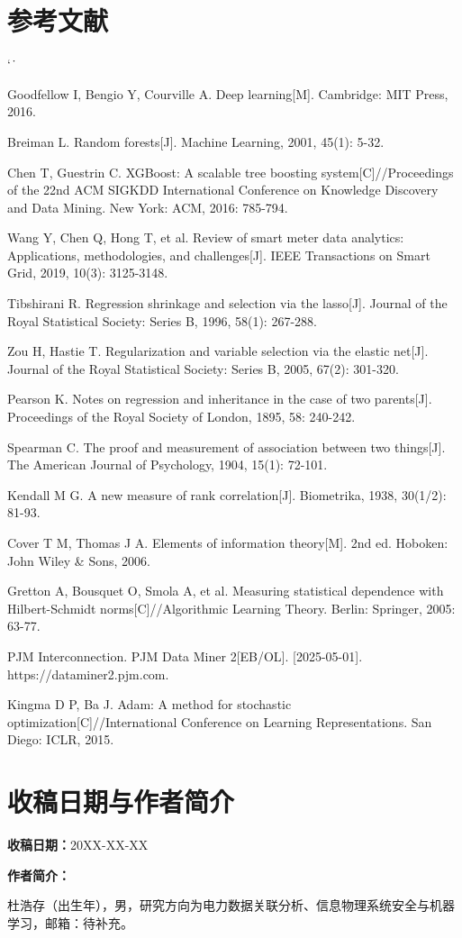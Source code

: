 \documentclass[UTF8,zihao=5,twoside]{ctexart}
\makeatletter
\numberwithin{equation}{section}
\renewcommand{\refname}{参考文献}
\renewenvironment{thebibliography}[1]{%
  \section*{\refname}%
  \small
  \list{[\arabic{enumi}]}{%
    \settowidth\labelwidth{[#1]}%
    \leftmargin\labelwidth
    \advance\leftmargin\labelsep
    \usecounter{enumi}}
  \sloppy\clubpenalty4000\widowpenalty4000\sfcode`\.\ \@m
}{\def\@noitemerr{\@latex@warning{Empty `thebibliography' environment}}\endlist}
\makeatother
\begin{document}
\begin{thebibliography}{99}
Goodfellow I, Bengio Y, Courville A. Deep learning[M]. Cambridge: MIT Press, 2016.

Breiman L. Random forests[J]. Machine Learning, 2001, 45(1): 5-32.

Chen T, Guestrin C. XGBoost: A scalable tree boosting system[C]//Proceedings of the 22nd ACM SIGKDD International Conference on Knowledge Discovery and Data Mining. New York: ACM, 2016: 785-794.

Wang Y, Chen Q, Hong T, et al. Review of smart meter data analytics: Applications, methodologies, and challenges[J]. IEEE Transactions on Smart Grid, 2019, 10(3): 3125-3148.

Tibshirani R. Regression shrinkage and selection via the lasso[J]. Journal of the Royal Statistical Society: Series B, 1996, 58(1): 267-288.

Zou H, Hastie T. Regularization and variable selection via the elastic net[J]. Journal of the Royal Statistical Society: Series B, 2005, 67(2): 301-320.

Pearson K. Notes on regression and inheritance in the case of two parents[J]. Proceedings of the Royal Society of London, 1895, 58: 240-242.

Spearman C. The proof and measurement of association between two things[J]. The American Journal of Psychology, 1904, 15(1): 72-101.

Kendall M G. A new measure of rank correlation[J]. Biometrika, 1938, 30(1/2): 81-93.

Cover T M, Thomas J A. Elements of information theory[M]. 2nd ed. Hoboken: John Wiley \& Sons, 2006.

Gretton A, Bousquet O, Smola A, et al. Measuring statistical dependence with Hilbert-Schmidt norms[C]//Algorithmic Learning Theory. Berlin: Springer, 2005: 63-77.

PJM Interconnection. PJM Data Miner 2[EB/OL]. [2025-05-01]. https://dataminer2.pjm.com.

Kingma D P, Ba J. Adam: A method for stochastic optimization[C]//International Conference on Learning Representations. San Diego: ICLR, 2015.
\end{thebibliography}

\section*{收稿日期与作者简介}
\noindent\textbf{收稿日期：}20XX-XX-XX

\noindent\textbf{作者简介：}\par
\noindent 杜浩存（出生年），男，研究方向为电力数据关联分析、信息物理系统安全与机器学习，邮箱：待补充。
\end{document}

